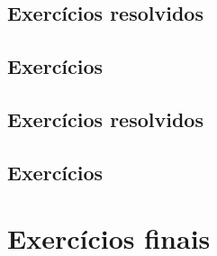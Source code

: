 \subsection*{Exercícios resolvidos}
\construirExeresol

\subsection*{Exercícios}
\construirExer




\subsection*{Exercícios resolvidos}
\construirExeresol

\subsection*{Exercícios}
\construirExer


\section{Exercícios finais}
\construirExer

